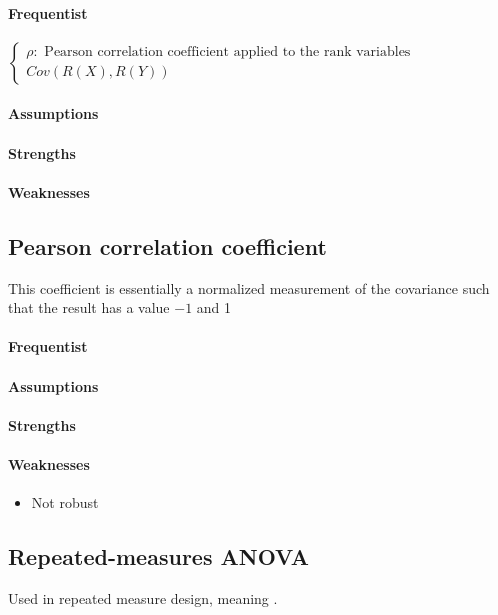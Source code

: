 \paragraph{Frequentist}
$\begin{cases}
\rho:\text{ Pearson correlation coefficient applied to the rank variables} \\
Cov\left(R(X), R(Y)\right)
\end{cases}$
\paragraph{Assumptions}
\paragraph{Strengths}
\paragraph{Weaknesses}

\subsection{Pearson correlation coefficient}
This coefficient is essentially a normalized measurement of the covariance such that the result
has a value $-1$ and 1
\paragraph{Frequentist}
\paragraph{Assumptions}
\paragraph{Strengths}
\paragraph{Weaknesses}
\begin{itemize}
    \item Not robust
\end{itemize}

\subsection{Repeated-measures ANOVA}
Used in repeated measure design, meaning .
